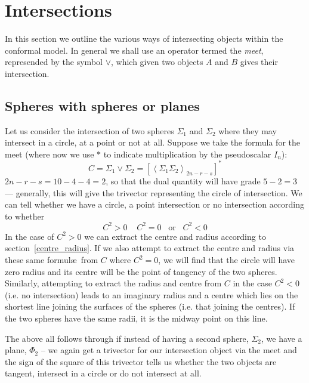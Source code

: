 \section{Intersections}

In this section we outline the various ways of intersecting
objects within the conformal model. In general we shall
use an operator termed the \emph{meet}, represended
by the symbol $\vee$, which given two objects $A$ and $B$
gives their intersection.

\subsection{Spheres with spheres or planes}

Let us consider the intersection of two spheres $\Sigma_1$ and
$\Sigma_2$ where they may intersect in a circle, at a point or not
at all. Suppose we take the formula for the meet\cite{GA:llw} (where now we use
$*$ to indicate multiplication by the pseudoscalar $I_n$):
%
\begin{equation}
C = \Sigma_1 \vee \Sigma_2 = \left[\left< \Sigma_1 \Sigma_2
\right>_{2n-r-s}\right]^*
\end{equation}
%
$2n-r-s = 10-4-4=2$, so that the dual quantity will have
grade $5-2=3$ --- generally, this will give the trivector
representing the circle of intersection. We can tell
whether we have a circle, a point intersection or no
intersection according to whether
%
\begin{equation}
C^2 >0 \;\;\;\; C^2 = 0 \;\;\;\mbox{or}\;\;\; C^2<0
\end{equation}
%
In the case of $C^2>0$ we can extract the centre and radius
according to section~\ref{centre_radius}. If we also attempt to
extract the centre and radius via these same formul\ae\ from $C$
where $C^2=0$, we will find that the circle will have zero radius
and its centre will be the point of tangency of the two spheres.
Similarly, attempting to extract the radius and centre from $C$ in
the case $C^2<0$ (i.e. no intersection) leads to an imaginary
radius and a centre which lies on the shortest line joining the
surfaces of the spheres (i.e. that joining the centres). If the
two spheres have the same radii, it is the midway point on this
line.

The above all follows through if instead of having a
second sphere, $\Sigma_2$, we have a plane, $\Phi_2$ -- we again get a
trivector for our intersection object via the meet and the sign of the square
of this trivector tells us whether the two objects are tangent, intersect in a
circle or do not intersect at all.

